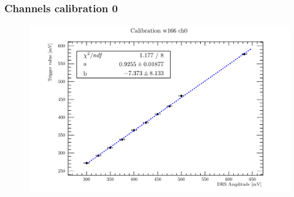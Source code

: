 \begin{frame} [fragile]
\small
	\frametitle{Channels calibration 0}
    		\begin{figure}
		 \centering
			\includegraphics[scale=0.5]{figures/ch0.pdf}
		\end{figure}  
\end{frame}
